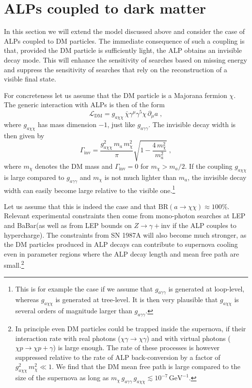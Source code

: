 \documentclass[11pt,a4paper]{article}
\newcommand{\ga}{g_{a\gamma\gamma}}
\def \babar {BaBar\xspace}
\begin{document}
\section{ALPs coupled to dark matter}
\label{sec:DM}

In this section we will extend the model discussed above and consider the case of ALPs coupled to DM particles. The immediate consequence of such a coupling is that, provided the DM particle is sufficiently light, the ALP obtains an invisible decay mode. This will enhance the sensitivity of searches based on missing energy and suppress the sensitivity of searches that rely on the reconstruction of a visible final state.

For concreteness let us assume that the DM particle is a Majorana fermion $\chi$. The generic interaction with ALPs is then of the form
\begin{equation}
 \mathcal{L}_\text{DM} = g_{a\chi\chi} \, \bar{\chi} \gamma^\mu \gamma^5 \chi \, \partial_\mu a\; ,
\end{equation}
where $g_{a\chi\chi}$ has mass dimension $-1$, just like $\ga$. The invisible decay width is then given by
\begin{equation}
\Gamma_\text{inv} = \frac{g_{a\chi\chi}^2 \, m_a \, m_\chi^2}{\pi} \sqrt{1 - \frac{4 \, m_\chi^2}{m_a^2}} \; , \label{eq:Gammainv}
\end{equation}
where $m_\chi$ denotes the DM mass and $\Gamma_\text{inv} = 0$ for $m_\chi > m_a / 2$. If the coupling $g_{a\chi\chi}$ is large compared to $\ga$ and $m_\chi$ is not much lighter than $m_a$, the invisible decay width can easily become large relative to the visible one.\footnote{This is for example the case if we assume that $\ga$ is generated at loop-level, whereas $g_{a\chi\chi}$ is generated at tree-level. It is then very plausible that $g_{a\chi\chi}$ is several orders of magnitude larger than $\ga$.}

Let us assume that this is indeed the case and that $\text{BR}(a \to \chi\chi) \approx 100\%$. Relevant experimental constraints then come from mono-photon searches at LEP and \babar (as well as from LEP bounds on $Z \to \gamma + \text{inv}$ if the ALP couples to hypercharge). The constraints from SN 1987A will also become much stronger, as the DM particles produced in ALP decays can contribute to supernova cooling even in parameter regions where the ALP decay length and mean free path are small.\footnote{
In principle even DM particles could be trapped inside the supernova, if their interaction rate with real photons ($\chi \gamma \to \chi \gamma$) and with virtual photons ($\chi p \to \chi p + \gamma$) is large enough. The rate of these processes is however suppressed relative to the rate of ALP back-conversion by a factor of $g_{a\chi\chi}^2 \, m_\chi^2 \ll 1$. We find that the DM mean free path is large compared to the size of the supernova as long as $m_\chi \, \ga \, g_{a\chi\chi} \lesssim 10^{-7} \, \mathrm{GeV^{-1}}$.}
\end{document}
